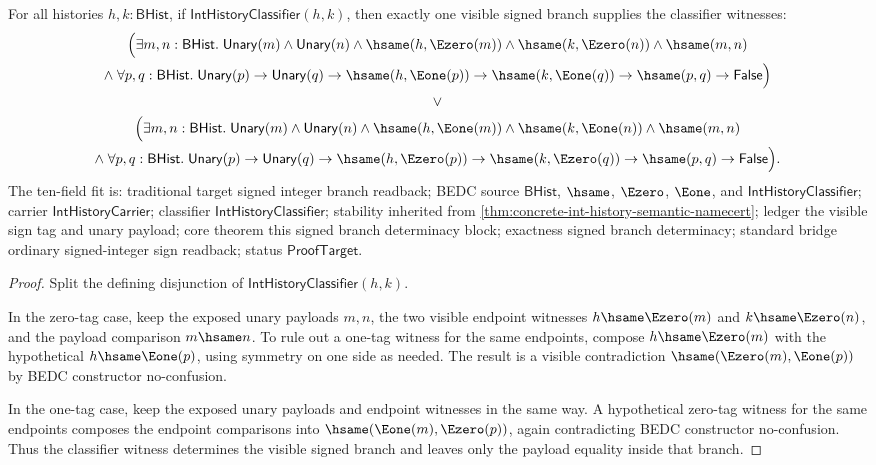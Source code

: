 \begin{theorem}
\label{thm:int-history-classifier-signed-branch-determinacy}
For all histories $h,k:\mathsf{BHist}$, if
$\mathsf{IntHistoryClassifier}(h,k)$, then exactly one visible signed branch
supplies the classifier witnesses:
$$
\begin{gathered}
\Bigl(\exists m,n:\mathsf{BHist}.\;
\mathsf{Unary}(m)\land\mathsf{Unary}(n)\land
\hsame(h,\Ezero(m))\land\hsame(k,\Ezero(n))\land\hsame(m,n)\\
\land\;
\forall p,q:\mathsf{BHist}.\;
\mathsf{Unary}(p)\to\mathsf{Unary}(q)\to
\hsame(h,\Eone(p))\to\hsame(k,\Eone(q))\to\hsame(p,q)\to\mathsf{False}
\Bigr)\\
\lor\\
\Bigl(\exists m,n:\mathsf{BHist}.\;
\mathsf{Unary}(m)\land\mathsf{Unary}(n)\land
\hsame(h,\Eone(m))\land\hsame(k,\Eone(n))\land\hsame(m,n)\\
\land\;
\forall p,q:\mathsf{BHist}.\;
\mathsf{Unary}(p)\to\mathsf{Unary}(q)\to
\hsame(h,\Ezero(p))\to\hsame(k,\Ezero(q))\to\hsame(p,q)\to\mathsf{False}
\Bigr).
\end{gathered}
$$
The ten-field fit is: traditional target signed integer branch readback; BEDC
source $\mathsf{BHist}$, $\hsame$, $\Ezero$, $\Eone$, and
$\mathsf{IntHistoryClassifier}$; carrier $\mathsf{IntHistoryCarrier}$;
classifier $\mathsf{IntHistoryClassifier}$; stability inherited from
\autoref{thm:concrete-int-history-semantic-namecert}; ledger the visible sign
tag and unary payload; core theorem this signed branch determinacy block;
exactness signed branch determinacy; standard bridge ordinary signed-integer
sign readback; status $\mathsf{ProofTarget}$.
\end{theorem}
\begin{proof}
Split the defining disjunction of $\mathsf{IntHistoryClassifier}(h,k)$.

In the zero-tag case, keep the exposed unary payloads $m,n$, the two visible
endpoint witnesses $h\hsame\Ezero(m)$ and $k\hsame\Ezero(n)$, and the payload
comparison $m\hsame n$. To rule out a one-tag witness for the same endpoints,
compose $h\hsame\Ezero(m)$ with the hypothetical $h\hsame\Eone(p)$, using
symmetry on one side as needed. The result is a visible contradiction
$\hsame(\Ezero(m),\Eone(p))$ by BEDC constructor no-confusion.

In the one-tag case, keep the exposed unary payloads and endpoint witnesses in
the same way. A hypothetical zero-tag witness for the same endpoints composes
the endpoint comparisons into $\hsame(\Eone(m),\Ezero(p))$, again contradicting
BEDC constructor no-confusion. Thus the classifier witness determines the
visible signed branch and leaves only the payload equality inside that branch.
\end{proof}

